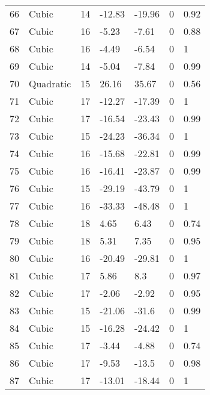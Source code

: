 \documentclass[11pt]{article}
\begin{document}
\begin{center}
\begin{longtable}{lllllll}
        66  & Cubic     & 14              & -12.83  & -19.96  & 0       & 0.92 \\
        67  & Cubic     & 16              & -5.23   & -7.61   & 0       & 0.88 \\
        68  & Cubic     & 16              & -4.49   & -6.54   & 0       & 1    \\
        69  & Cubic     & 14              & -5.04   & -7.84   & 0       & 0.99 \\
        70  & Quadratic & 15              & 26.16   & 35.67   & 0       & 0.56 \\
        71  & Cubic     & 17              & -12.27  & -17.39  & 0       & 1    \\
        72  & Cubic     & 17              & -16.54  & -23.43  & 0       & 0.99 \\
        73  & Cubic     & 15              & -24.23  & -36.34  & 0       & 1    \\
        74  & Cubic     & 16              & -15.68  & -22.81  & 0       & 0.99 \\
        75  & Cubic     & 16              & -16.41  & -23.87  & 0       & 0.99 \\
        76  & Cubic     & 15              & -29.19  & -43.79  & 0       & 1    \\
        77  & Cubic     & 16              & -33.33  & -48.48  & 0       & 1    \\
        78  & Cubic     & 18              & 4.65    & 6.43    & 0       & 0.74 \\
        79  & Cubic     & 18              & 5.31    & 7.35    & 0       & 0.95 \\
        80  & Cubic     & 16              & -20.49  & -29.81  & 0       & 1    \\
        81  & Cubic     & 17              & 5.86    & 8.3     & 0       & 0.97 \\
        82  & Cubic     & 17              & -2.06   & -2.92   & 0       & 0.95 \\
        83  & Cubic     & 15              & -21.06  & -31.6   & 0       & 0.99 \\
        84  & Cubic     & 15              & -16.28  & -24.42  & 0       & 1    \\
        85  & Cubic     & 17              & -3.44   & -4.88   & 0       & 0.74 \\
        86  & Cubic     & 17              & -9.53   & -13.5   & 0       & 0.98 \\
        87  & Cubic     & 17              & -13.01  & -18.44  & 0       & 1    \\

\end{longtable}
\end{center}
\end{document}
